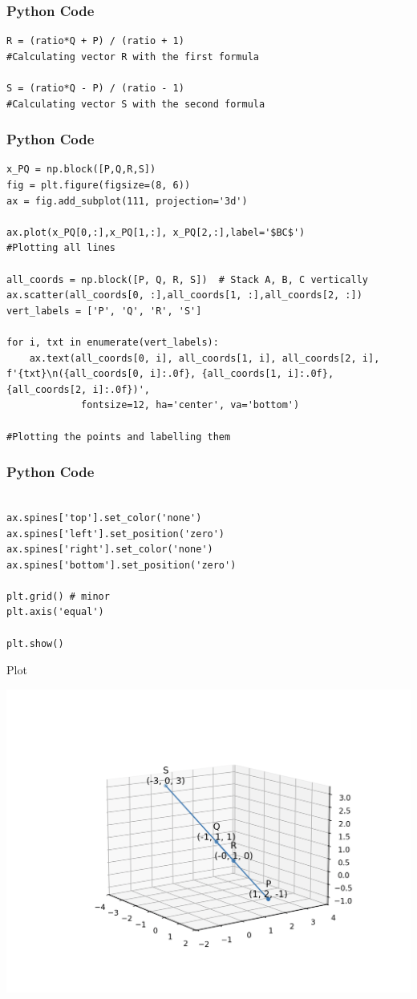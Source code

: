\documentclass{beamer}
\begin{document}
\begin{frame}[fragile]
    \frametitle{Python Code}

    \begin{lstlisting}
R = (ratio*Q + P) / (ratio + 1)
#Calculating vector R with the first formula

S = (ratio*Q - P) / (ratio - 1)
#Calculating vector S with the second formula

    \end{lstlisting}
\end{frame}

\begin{frame}[fragile]
    \frametitle{Python Code}

    \begin{lstlisting}
x_PQ = np.block([P,Q,R,S])
fig = plt.figure(figsize=(8, 6))
ax = fig.add_subplot(111, projection='3d')

ax.plot(x_PQ[0,:],x_PQ[1,:], x_PQ[2,:],label='$BC$')
#Plotting all lines

all_coords = np.block([P, Q, R, S])  # Stack A, B, C vertically
ax.scatter(all_coords[0, :],all_coords[1, :],all_coords[2, :])
vert_labels = ['P', 'Q', 'R', 'S']

for i, txt in enumerate(vert_labels):
    ax.text(all_coords[0, i], all_coords[1, i], all_coords[2, i], f'{txt}\n({all_coords[0, i]:.0f}, {all_coords[1, i]:.0f}, {all_coords[2, i]:.0f})',
             fontsize=12, ha='center', va='bottom')

#Plotting the points and labelling them

\end{lstlisting}
\end{frame}

\begin{frame}[fragile]
    \frametitle{Python Code}

    \begin{lstlisting}

ax.spines['top'].set_color('none')
ax.spines['left'].set_position('zero')
ax.spines['right'].set_color('none')
ax.spines['bottom'].set_position('zero')

plt.grid() # minor
plt.axis('equal')

plt.show()

    \end{lstlisting}
\end{frame}

\begin{frame}{Plot}
    \begin{center}
        \includegraphics[width=\linewidth]{Figs/Figure_1.png}
    \end{center}
\end{frame}
\end{document}
